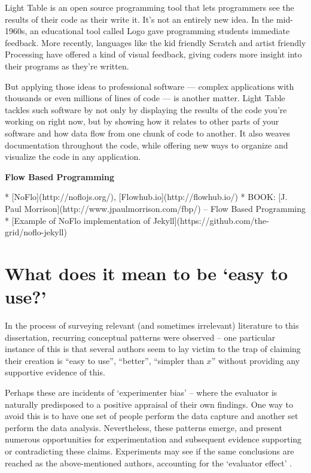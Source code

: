 \documentclass[11pt,openright,a4paper]{report}
\begin{document}
    Light Table is an open source programming tool that lets programmers see the results of their code as their write it. It’s not an entirely new idea. In the mid-1960s, an educational tool called Logo gave programming students immediate feedback. More recently, languages like the kid friendly Scratch and artist friendly Processing have offered a kind of visual feedback, giving coders more insight into their programs as they’re written.
    
    But applying those ideas to professional software — complex applications with thousands or even millions of lines of code — is another matter. Light Table tackles such software by not only by displaying the results of the code you’re working on right now, but by showing how it relates to other parts of your software and how data flow from one chunk of code to another. It also weaves documentation throughout the code, while offering new ways to organize and visualize the code in any application.

    \textbf{Flow Based Programming}

* [NoFlo](http://noflojs.org/), [Flowhub.io](http://flowhub.io/)
* BOOK: [J. Paul Morrison](http://www.jpaulmorrison.com/fbp/) -- Flow Based Programming
* [Example of NoFlo implementation of Jekyll](https://github.com/the-grid/noflo-jekyll)

\section{What does it mean to be `easy to use?'}

In the process of surveying relevant (and sometimes irrelevant) literature to
this dissertation, recurring conceptual patterns were observed -- one particular instance
of this is that several authors seem to lay victim to the trap of claiming their
creation is ``easy to use'', ``better'', ``simpler than \(x\)'' without
providing any supportive evidence of this.

Perhaps these are incidents of `experimenter bias' -- where
the evaluator is naturally predisposed to a positive appraisal of their own
findings. One way to avoid this is to have one set of people perform the data
capture and another set perform the data analysis. Nevertheless, these patterns
emerge, and present numerous opportunities for experimentation and subsequent
evidence supporting or contradicting these claims. Experiments may see if the
same conclusions are reached as the above-mentioned authors, accounting for the
`evaluator effect'  \cite{Hertzum2001}.
\end{document}
